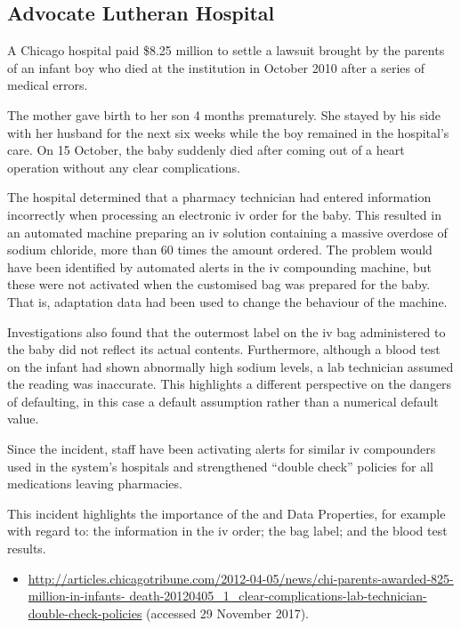 \subsection{Advocate Lutheran Hospital} \label{bkm:incacc:advocatelutheran}
A Chicago hospital paid \$8.25 million to settle a lawsuit brought by the parents of an infant boy who died at the institution in October 2010 after a series of medical errors.

The mother gave birth to her son 4 months prematurely. She stayed by his side with her husband for the next six weeks while the boy remained in the hospital's care. On 15 October, the baby suddenly died after coming out of a heart operation without any clear complications.

The hospital determined that a pharmacy technician had entered information incorrectly when processing an electronic \gls{iv} order for the baby. This resulted in an automated machine preparing an \gls{iv} solution containing a massive overdose of sodium chloride, more than 60 times the amount ordered. The problem would have been identified by automated alerts in the \gls{iv} compounding machine, but these were not activated when the customised bag was prepared for the baby. That is, adaptation data had been used to change the behaviour of the machine.

Investigations also found that the outermost label on the \gls{iv} bag administered to the baby did not reflect its actual contents. Furthermore, although a blood test on the infant had shown abnormally high sodium levels, a lab technician assumed the reading was inaccurate. This highlights a different perspective on the dangers of defaulting, in this case a default assumption rather than a numerical default value.

Since the incident, staff have been activating alerts for similar \gls{iv} compounders used in the system's hospitals and strengthened ``double check'' policies for all medications leaving pharmacies.

This incident highlights the importance of the  and  Data Properties, for example with regard to: the information in the \gls{iv} order; the bag label; and the blood test results.

\begin{samepage}
\begin{itemize}
  \item \raggedright{\href{http://articles.chicagotribune.com/2012-04-05/news/chi-parents-awarded-825-million-in-infants-death-20120405_1_clear-complications-lab-technician-double-check-policies}{http://articles.chicagotribune.com/2012-04-05/news/chi-parents-awarded-825-million-in-infants- death-20120405\_1\_clear-complications-lab-technician-double-check-policies} (accessed 29 November 2017).}
\end{itemize}
\end{samepage}


